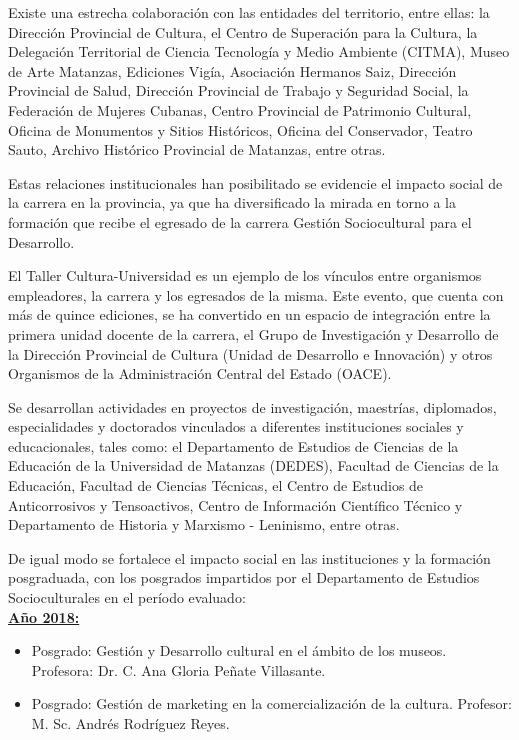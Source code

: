 Existe una estrecha colaboración con las entidades del territorio, entre ellas: la Dirección Provincial de Cultura, el Centro de Superación para la Cultura, la Delegación Territorial de Ciencia Tecnología y Medio Ambiente (CITMA), Museo de Arte Matanzas, Ediciones Vigía, Asociación Hermanos Saiz, Dirección Provincial de Salud, Dirección Provincial de Trabajo y Seguridad Social, la Federación de Mujeres Cubanas, Centro Provincial de Patrimonio Cultural, Oficina de Monumentos y Sitios Históricos, Oficina del Conservador, Teatro Sauto, Archivo Histórico Provincial de Matanzas, entre otras.

Estas relaciones institucionales han posibilitado se evidencie el impacto social de la carrera en la provincia, ya que ha diversificado la mirada en torno a la formación que recibe el egresado de la carrera Gestión Sociocultural para el Desarrollo.

El Taller Cultura-Universidad es un ejemplo de los vínculos entre organismos empleadores, la carrera y los egresados de la misma. Este evento, que cuenta con más de quince ediciones, se ha convertido en un espacio de integración entre la primera unidad docente de la carrera, el Grupo de Investigación y Desarrollo de la Dirección Provincial de Cultura (Unidad de Desarrollo e Innovación) y otros Organismos de la Administración Central del Estado (OACE).

Se desarrollan actividades en proyectos de investigación, maestrías, diplomados, especialidades y doctorados vinculados a diferentes instituciones sociales y educacionales, tales como: el Departamento de Estudios de Ciencias de la Educación de la Universidad de Matanzas (DEDES), Facultad de Ciencias de la Educación, Facultad de Ciencias Técnicas, el Centro de Estudios de Anticorrosivos y Tensoactivos, Centro de Información Científico Técnico y Departamento de Historia y Marxismo - Leninismo, entre otras.

De igual modo se fortalece el impacto social en las instituciones y la formación posgraduada, con los posgrados impartidos por el Departamento de Estudios Socioculturales en el período evaluado:\\

\underline{\textbf{Año 2018:}}

\begin{itemize}
	\setlength\itemsep{-0.5em}
	\item Posgrado: Gestión y Desarrollo cultural en el ámbito de los museos. Profesora: Dr. C. Ana Gloria Peñate Villasante. 
	\item Posgrado: Gestión de marketing en la comercialización de la cultura. Profesor: M. Sc. Andrés Rodríguez Reyes.
\end{itemize}

